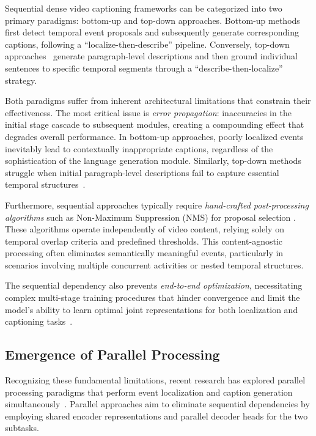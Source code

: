 Sequential dense video captioning frameworks can be categorized into two primary paradigms: bottom-up and top-down approaches.
Bottom-up methods~\cite{krishna2017dense,li2018jointly,wang2018bidirectional,zhou2018end,mun2019streamlined} first detect temporal event proposals and subsequently generate corresponding captions, following a ``localize-then-describe'' pipeline.
Conversely, top-down approaches~\cite{deng2021sketch} generate paragraph-level descriptions and then ground individual sentences to specific temporal segments through a ``describe-then-localize'' strategy.

Both paradigms suffer from inherent architectural limitations that constrain their effectiveness.
The most critical issue is \textit{error propagation}: inaccuracies in the initial stage cascade to subsequent modules, creating a compounding effect that degrades overall performance.
In bottom-up approaches, poorly localized events inevitably lead to contextually inappropriate captions, regardless of the sophistication of the language generation module.
Similarly, top-down methods struggle when initial paragraph-level descriptions fail to capture essential temporal structures~\cite{wang2021end}.

Furthermore, sequential approaches typically require \textit{hand-crafted post-processing algorithms} such as Non-Maximum Suppression (NMS) for proposal selection \cite{hosang2017learning}.
These algorithms operate independently of video content, relying solely on temporal overlap criteria and predefined thresholds.
This content-agnostic processing often eliminates semantically meaningful events, particularly in scenarios involving multiple concurrent activities or nested temporal structures.

The sequential dependency also prevents \textit{end-to-end optimization}, necessitating complex multi-stage training procedures that hinder convergence and limit the model's ability to learn optimal joint representations for both localization and captioning tasks~\cite{zhou2018end,wang2021end}.

\subsection{Emergence of Parallel Processing}
Recognizing these fundamental limitations, recent research has explored parallel processing paradigms that perform event localization and caption generation simultaneously~\cite{wang2021end}.
Parallel approaches aim to eliminate sequential dependencies by employing shared encoder representations and parallel decoder heads for the two subtasks.

